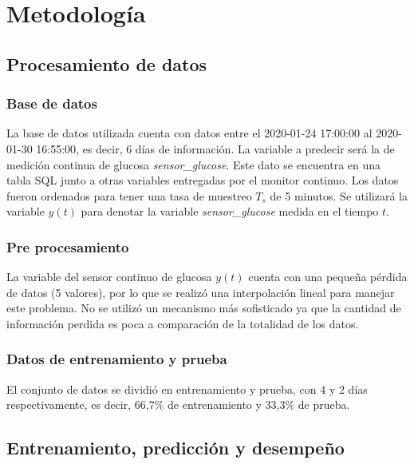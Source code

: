 




\section{Metodología}



\subsection{Procesamiento de datos}

\subsubsection*{Base de datos}

La base de datos utilizada cuenta con datos entre el 2020-01-24 17:00:00 al 2020-01-30 16:55:00, es decir, 6 días de información. La variable a predecir será la de medición continua de glucosa \emph{sensor\_glucose}. Este dato se encuentra en una tabla SQL junto a otras variables entregadas por el monitor continuo. Los datos fueron ordenados para tener una tasa de muestreo $T_s$ de 5 minutos.
Se utilizará la variable $y(t)$ para denotar la variable \emph{sensor\_glucose} medida en el tiempo $t$.

\subsubsection*{Pre procesamiento}

La variable del sensor continuo de glucosa $y(t)$ cuenta con una pequeña pérdida de datos (5 valores), por lo que se realizó una interpolación lineal para manejar este problema. No se utilizó un mecanismo más sofisticado ya que la cantidad de información perdida es poca a comparación de la totalidad de los datos.

\subsubsection*{Datos de entrenamiento y prueba}

El conjunto de datos se dividió en entrenamiento y prueba, con 4 y 2 días respectivamente, es decir, 66,7\% de entrenamiento y 33,3\% de prueba.

\subsection{Entrenamiento, predicción y desempeño}

